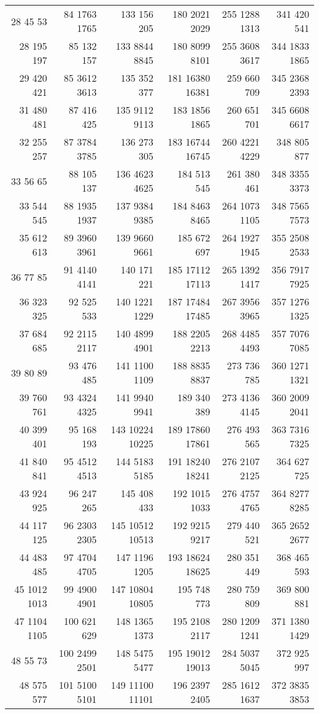 \begin{center}
\begin{longtable}[c]{*{6}{r}}
28 45 53&84 1763 1765&133 156 205&180 2021 2029&255 1288 1313&341 420 541\\
28 195 197&85 132 157&133 8844 8845&180 8099 8101&255 3608 3617&344 1833 1865\\
29 420 421&85 3612 3613&135 352 377&181 16380 16381&259 660 709&345 2368 2393\\
31 480 481&87 416 425&135 9112 9113&183 1856 1865&260 651 701&345 6608 6617\\
32 255 257&87 3784 3785&136 273 305&183 16744 16745&260 4221 4229&348 805 877\\
33 56 65&88 105 137&136 4623 4625&184 513 545&261 380 461&348 3355 3373\\
33 544 545&88 1935 1937&137 9384 9385&184 8463 8465&264 1073 1105&348 7565 7573\\
35 612 613&89 3960 3961&139 9660 9661&185 672 697&264 1927 1945&355 2508 2533\\
36 77 85&91 4140 4141&140 171 221&185 17112 17113&265 1392 1417&356 7917 7925\\
36 323 325&92 525 533&140 1221 1229&187 17484 17485&267 3956 3965&357 1276 1325\\
37 684 685&92 2115 2117&140 4899 4901&188 2205 2213&268 4485 4493&357 7076 7085\\
39 80 89&93 476 485&141 1100 1109&188 8835 8837&273 736 785&360 1271 1321\\
39 760 761&93 4324 4325&141 9940 9941&189 340 389&273 4136 4145&360 2009 2041\\
40 399 401&95 168 193&143 10224 10225&189 17860 17861&276 493 565&363 7316 7325\\
41 840 841&95 4512 4513&144 5183 5185&191 18240 18241&276 2107 2125&364 627 725\\
43 924 925&96 247 265&145 408 433&192 1015 1033&276 4757 4765&364 8277 8285\\
44 117 125&96 2303 2305&145 10512 10513&192 9215 9217&279 440 521&365 2652 2677\\
44 483 485&97 4704 4705&147 1196 1205&193 18624 18625&280 351 449&368 465 593\\
45 1012 1013&99 4900 4901&147 10804 10805&195 748 773&280 759 809&369 800 881\\
47 1104 1105&100 621 629&148 1365 1373&195 2108 2117&280 1209 1241&371 1380 1429\\
48 55 73&100 2499 2501&148 5475 5477&195 19012 19013&284 5037 5045&372 925 997\\
48 575 577&101 5100 5101&149 11100 11101&196 2397 2405&285 1612 1637&372 3835 3853\\

\end{longtable}
\end{center}
